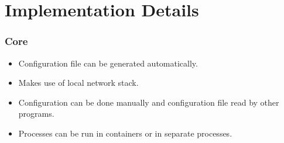 \documentclass{beamer}
\begin{document}
\section{Implementation Details}

\begin{frame}
  \frametitle{Core}

  \begin{itemize}
  \item Configuration file can be generated automatically.
  \item Makes use of local network stack.
  \item Configuration can be done manually and configuration file read
    by other programs.
  \item Processes can be run in containers or in separate processes.
  \end{itemize}

\end{frame}
\end{document}
